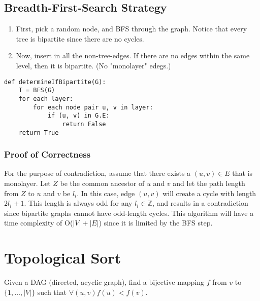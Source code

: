 \documentclass[10pt]{article}
\begin{document}
\subsection*{Breadth-First-Search Strategy}
\begin{enumerate}
	\item First, pick a random node, and BFS through the graph.  Notice that every tree is bipartite since there are no cycles.
	\item Now, insert in all the non-tree-edges.  If there are no edges within the same level, then it is bipartite.  (No "monolayer" edegs.)
\end{enumerate}
\begin{verbatim}
def determineIfBipartite(G):
    T = BFS(G)
    for each layer:
        for each node pair u, v in layer:
            if (u, v) in G.E:
                return False
    return True
\end{verbatim}
\subsubsection*{Proof of Correctness}
For the purpose of contradiction, assume that there exists a $(u, v) \in E$ that is monolayer.  Let $Z$ be the common ancestor of $u$ and $v$ and let the path length from $Z$ to $u$ and $v$ be $l_i$.  In this case, edge $(u, v)$ will create a cycle with length $2 l_i + 1$.  This length is always odd for any $l_i \in \mathbb{Z}$, and results in a contradiction since bipartite graphs cannot have odd-length cycles.  This algorithm will have a time complexity of O($|V| + |E|$) since it is limited by the BFS step.

\section*{Topological Sort}
Given a DAG (directed, acyclic graph), find a bijective mapping $f$ from $v$ to $\{1, \dots, |V|\}$ such that $\forall (u, v) f(u) < f(v)$.
\end{document}
